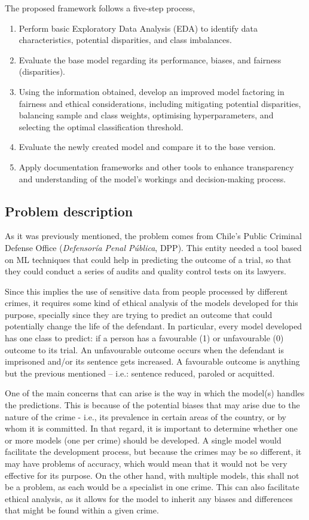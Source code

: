 \documentclass[fleqn,10pt]{wlscirep}
\begin{document}
The proposed framework follows a five-step process,

\begin{enumerate}
    \item Perform basic Exploratory Data Analysis (EDA) to identify data characteristics, potential disparities, and class imbalances.
    \item Evaluate the base model regarding its performance, biases, and fairness (disparities).
    \item Using the information obtained, develop an improved model factoring in fairness and ethical considerations, including mitigating potential disparities, balancing sample and class weights, optimising hyperparameters, and selecting the optimal classification threshold.
    \item Evaluate the newly created model and compare it to the base version.
    \item Apply documentation frameworks and other tools to enhance transparency and understanding of the model's workings and decision-making process.
\end{enumerate}

\subsection{Problem description}

As it was previously mentioned, the problem comes from Chile's Public Criminal Defense Office (\textit{Defensoría Penal Pública}, DPP). This entity needed a tool based on ML techniques that could help in predicting the outcome of a trial, so that they could conduct a series of audits and quality control tests on its lawyers. 

Since this implies the use of sensitive data from people processed by different crimes, it requires some kind of ethical analysis of the models developed for this purpose, specially since they are trying to predict an outcome that could potentially change the life of the defendant. In particular, every model developed has one class to predict: if a person has a favourable (1) or unfavourable (0) outcome to its trial. An unfavourable outcome occurs when the defendant is imprisoned and/or its sentence gets increased. A favourable outcome is anything but the previous mentioned -- i.e.: sentence reduced, paroled or acquitted. 

One of the main concerns that can arise is the way in which the model(s) handles the predictions. This is because of the potential biases that may arise due to the nature of the crime - i.e., its prevalence in certain areas of the country, or by whom it is committed. In that regard, it is important to determine whether one or more models (one per crime) should be developed. A single model would facilitate the development process, but because the crimes may be so different, it may have problems of accuracy, which would mean that it would not be very effective for its purpose. On the other hand, with multiple models, this shall not be a problem, as each would be a specialist in one crime. This can also facilitate ethical analysis, as it allows for the model to inherit any biases and differences that might be found within a given crime.
\end{document}
